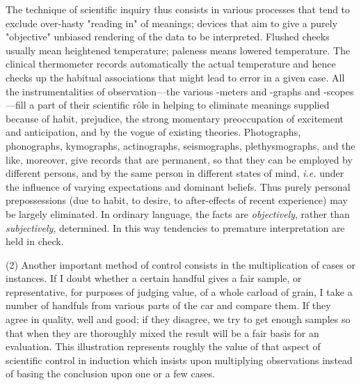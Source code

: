 \documentclass[letterpaper]{book}
\begin{document}
The technique of scientific inquiry thus consists in various processes
that tend to exclude over-hasty "reading in" of meanings; devices that
aim to give a purely "objective" unbiased rendering of the data to be
interpreted. Flushed cheeks usually mean heightened temperature;
paleness means lowered temperature. The clinical thermometer records
automatically the actual temperature and hence checks up the habitual
associations that might lead to error in a given case. All the
instrumentalities of observation---the various -meters and -graphs and
-scopes---fill a
part
of their scientific rôle in helping to eliminate meanings supplied
because of habit, prejudice, the strong momentary preoccupation of
excitement and anticipation, and by the vogue of existing theories.
Photographs, phonographs, kymographs, actinographs, seismographs,
plethysmographs, and the like, moreover, give records that are
permanent, so that they can be employed by different persons, and by the
same person in different states of mind, \emph{i.e.} under the influence
of varying expectations and dominant beliefs. Thus purely personal
prepossessions (due to habit, to desire, to after-effects of recent
experience) may be largely eliminated. In ordinary language, the facts
are \emph{objectively}, rather than \emph{subjectively}, determined. In
this way tendencies to premature interpretation are held in check.


(2) Another important method of control consists in the multiplication
of cases or instances. If I doubt whether a certain handful gives a fair
sample, or representative, for purposes of judging value, of a whole
carload of grain, I take a number of handfuls from various parts of the
car and compare them. If they agree in quality, well and good; if they
disagree, we try to get enough samples so that when they are thoroughly
mixed the result will be a fair basis for an evaluation. This
illustration represents roughly the value of that aspect of scientific
control in induction which insists upon multiplying observations instead
of basing the conclusion upon one or a few cases.

\end{document}
